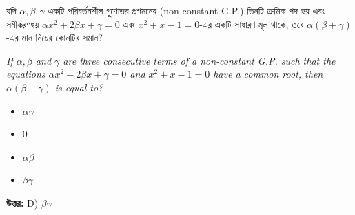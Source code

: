\documentclass[12pt, a4paper]{article}
\begin{document}
\begin{tcolorbox}[questionbox={প্রশ্ন (Question) 27}]
    \noindent
    যদি $\alpha, \beta, \gamma$ একটি পরিবর্তনশীল গুণোত্তর প্রগমনের (non-constant G.P.) তিনটি ক্রমিক পদ হয় এবং সমীকরণদ্বয় $\alpha x^2 + 2\beta x + \gamma = 0$ এবং $x^2 + x - 1 = 0$-এর একটি সাধারণ মূল থাকে, তবে $\alpha(\beta+\gamma)$-এর মান নিচের কোনটির সমান?
    
    \vspace{0.8em}
    \begin{english}
    \noindent\textit{\color{darkgray}
    If $\alpha, \beta$ and $\gamma$ are three consecutive terms of a non-constant G.P. such that the equations $\alpha x^2 + 2\beta x + \gamma = 0$ and $x^2 + x - 1 = 0$ have a common root, then $\alpha(\beta+\gamma)$ is equal to?
    }
    \end{english}
\end{tcolorbox}

\begin{itemize}[label={}, leftmargin=1cm, itemsep=0.5em]
    \item[\textbf{A)}] $\alpha\gamma$
    \item[\textbf{B)}] $0$
    \item[\textbf{C)}] $\alpha\beta$
    \item[\textbf{D)}] $\beta\gamma$
\end{itemize}

\vspace{0.5em}
\begin{tcolorbox}[answerbox]
    \textbf{\color{success} উত্তর:} D) $\beta\gamma$
\end{tcolorbox}
\vspace{1em}
\end{document}
